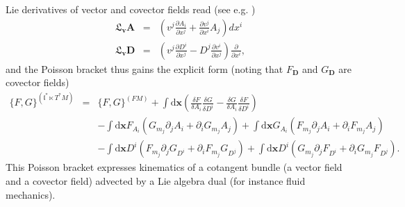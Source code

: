 \documentclass[
10pt, %
a4paper, %
oneside, %
headinclude,footinclude, %
BCOR5mm, %
]{scrartcl}
\newcommand{\xx}{\mathbf{x}}
\newcommand{\dx}{\mathrm{d}\xx}
\newcommand{\vv}{\mathbf{v}}
\renewcommand{\AA}{\mathbf{A}}
\newcommand{\DD}{\mathbf{D}}
\newcommand{\Lie}{\mathfrak{L}}
\newcommand{\Ffunc}{F}
\newcommand{\Gfunc}{G}
\newcommand{\LA}{\mathfrak{l}}
\begin{document}
 Lie derivatives of vector and covector fields read (see e.g. \cite{Fecko})
 \begin{subequations}
\begin{eqnarray}
\Lie_\vv \AA &=& \left(v^j \frac{\partial A_i}{\partial x^j} + \frac{\partial v^j}{\partial x^i}A_j\right) dx^i\\
\Lie_\vv \DD &=& \left(v^j \frac{\partial D^i}{\partial x^j} - D^j\frac{\partial v^i}{\partial x^j}\right)\frac{\partial}{\partial x^i},
\end{eqnarray}
\end{subequations}
and the Poisson bracket thus gains the explicit form (noting that $\Ffunc_\DD$ and $\Gfunc_\DD$ are 
covector fields)
\begin{eqnarray}
	\{\Ffunc,\Gfunc\}^{(\LA^*\ltimes T^*M)} &=& \{\Ffunc,\Gfunc\}^{(FM)} 
    + \int\dx \left(\frac{\delta \Ffunc}{\delta A_i}\frac{\delta \Gfunc}{\delta 
    D^i}-\frac{\delta \Gfunc}{\delta A_i}\frac{\delta \Ffunc}{\delta 
    D^i}\right)\\
	&&-\int\dx  \Ffunc_{A_i} (\Gfunc_{m_j} \partial_j A_i + \partial_i \Gfunc_{m_j}A_j)
	+\int\dx  \Gfunc_{A_i} (\Ffunc_{m_j} \partial_j A_i + \partial_i \Ffunc_{m_j}A_j)\nonumber\\
	&&- \int\dx D^i(\Ffunc_{m_j} \partial_j \Gfunc_{D^i} + \partial_i \Ffunc_{m_j} \Gfunc_{D^j} )
   + \int\dx D^i(\Gfunc_{m_j} \partial_j \Ffunc_{D^i} + \partial_i \Gfunc_{m_j} 
   \Ffunc_{D^j}).\nonumber
\end{eqnarray}
 This Poisson bracket expresses kinematics of a cotangent bundle (a vector field and a covector field) advected by a Lie algebra dual (for instance fluid mechanics).
 
\end{document}
